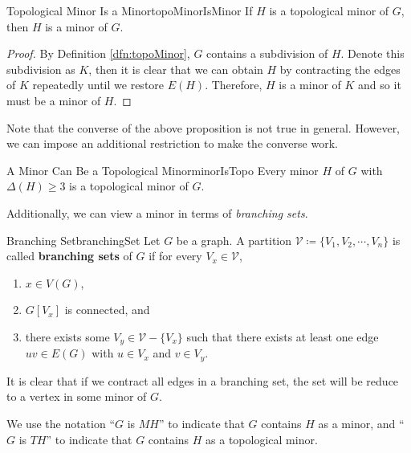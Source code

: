 \documentclass[math, code]{amznotes}
\theoremstyle{remark}
\begin{document}
\begin{probox}{Topological Minor Is a Minor}{topoMinorIsMinor}
    If $H$ is a topological minor of $G$, then $H$ is a minor of $G$.
    \tcblower
    \begin{proof}
        By Definition \ref{dfn:topoMinor}, $G$ contains a subdivision of $H$. Denote this subdivision as $K$, then it is clear that we can obtain $H$ by contracting the edges of $K$ repeatedly until we restore $E(H)$. Therefore, $H$ is a minor of $K$ and so it must be a minor of $H$.
    \end{proof}
\end{probox}
Note that the converse of the above proposition is not true in general. However, we can impose an additional restriction to make the converse work.
\begin{probox}{A Minor Can Be a Topological Minor}{minorIsTopo}
    Every minor $H$ of $G$ with $\Delta(H) \geq 3$ is a topological minor of $G$.
\end{probox}
Additionally, we can view a minor in terms of \textit{branching sets}.
\begin{dfnbox}{Branching Set}{branchingSet}
    Let $G$ be a graph. A partition $\mathcal{V} \coloneqq \{V_1, V_2, \cdots, V_n\}$ is called {\color{red} \textbf{branching sets}} of $G$ if for every $V_x \in \mathcal{V}$,
    \begin{enumerate}
        \item $x \in V(G)$,
        \item $G[V_x]$ is connected, and
        \item there exists some $V_y \in \mathcal{V} - \{V_x\}$ such that there exists at least one edge $uv \in E(G)$ with $u \in V_x$ and $v \in V_y$.
    \end{enumerate}
\end{dfnbox}
It is clear that if we contract all edges in a branching set, the set will be reduce to a vertex in some minor of $G$. 

We use the notation ``$G$ is $MH$'' to indicate that $G$ contains $H$ as a minor, and ``$G$ is $TH$'' to indicate that $G$ contains $H$ as a topological minor.
\end{document}

